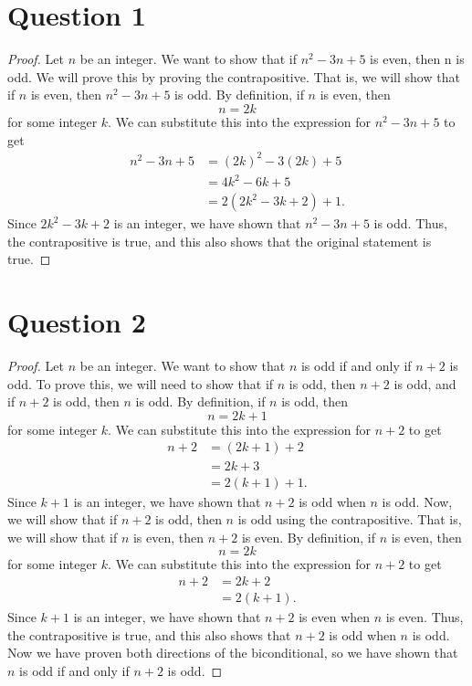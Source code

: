 \documentclass{article}
\begin{document}
\section*{Question 1}
\begin{proof}
    Let $n$ be an integer.
    We want to show that if $n^2 - 3n + 5$ is even, then n is odd.
    We will prove this by proving the contrapositive.
    That is, we will show that if $n$ is even, then $n^2 - 3n + 5$ is odd.
    By definition, if $n$ is even, then $$n = 2k$$ for some integer $k$.
    We can substitute this into the expression for $n^2 - 3n + 5$ to get
    \begin{align*}
        n^2 - 3n + 5 &= (2k)^2 - 3(2k) + 5 \\
        &= 4k^2 - 6k + 5 \\
        &= 2(2k^2 - 3k + 2) + 1.
    \end{align*}
    Since $2k^2 - 3k + 2$ is an integer, we have shown that $n^2 - 3n + 5$ is odd.
    Thus, the contrapositive is true, and this also shows that the original statement is true.
\end{proof}

\section*{Question 2}
\begin{proof}
    Let $n$ be an integer.
    We want to show that $n$ is odd if and only if $n + 2$ is odd.
    To prove this, we will need to show that if $n$ is odd, then $n + 2$ is odd, and if $n + 2$ is odd, then $n$ is odd.
    By definition, if $n$ is odd, then $$n = 2k + 1$$ for some integer $k$.
    We can substitute this into the expression for $n + 2$ to get
    \begin{align*}
        n + 2 &= (2k + 1) + 2 \\
        &= 2k + 3 \\
        &= 2(k + 1) + 1.
    \end{align*}
    Since $k + 1$ is an integer, we have shown that $n + 2$ is odd when $n$ is odd.
    Now, we will show that if $n + 2$ is odd, then $n$ is odd using the contrapositive.
    That is, we will show that if $n$ is even, then $n + 2$ is even.
    By definition, if $n$ is even, then $$n = 2k$$ for some integer $k$.
    We can substitute this into the expression for $n + 2$ to get
    \begin{align*}
        n + 2 &= 2k + 2 \\
        &= 2(k + 1).
    \end{align*}
    Since $k + 1$ is an integer, we have shown that $n + 2$ is even when $n$ is even.
    Thus, the contrapositive is true, and this also shows that $n + 2$ is odd when $n$ is odd.
    Now we have proven both directions of the biconditional, so we have shown that $n$ is odd if and only if $n + 2$ is odd.
\end{proof}
\end{document}
